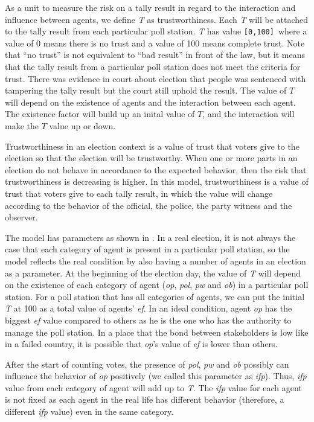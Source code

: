 \documentclass[JIP]{ipsj}
\def\|{\verb|}
\begin{document}
As a unit to measure the risk on a tally result in regard to the interaction and influence between agents, we define \textit{T} as trustworthiness. Each \textit{T} will be attached to the tally result from each particular poll station. \textit{T} has value \|[0,100]|\ where a value of 0 means there is no trust and a value of 100 means complete trust. Note that “no trust” is not equivalent to “bad result” in front of the law, but it means that the tally result from a particular poll station does not meet the criteria for trust. There was evidence in court about election that people was sentenced with tampering the tally result but the court still uphold the result. The value of $T$ will depend on the existence of agents and the interaction between each agent. The existence factor will build up an inital value of $T$, and the interaction will make the $T$ value up or down.

Trustworthiness in an election context is a value of trust that voters give to the election so that the election will be trustworthy. When one or more parts in an election do not behave in accordance to the expected behavior, then the risk that trustworthiness is decreasing is higher. In this model, trustworthiness is a value of trust that voters give to each tally result, in which the value will change according to the behavior of the official, the police, the party witness and the observer.

The model has parameters as shown in . In a real election, it is not always the case that each category of agent is present in a particular poll station, so the model reflects the real condition by also having a number of agents in an election as a parameter. At the beginning of the election day, the value of \textit{T} will depend on the existence of each category of agent (\textit{op}, \textit{pol}, \textit{pw} and \textit{ob}) in a particular poll station. For a poll station that has all categories of agents, we can put the initial \textit{T} at 100 as a total value of agents' \textit{ef}. In an ideal condition, agent \textit{op} has the biggest \textit{ef} value compared to others as he is the one who has the authority to manage the poll station. In a place that the bond between stakeholders is low like in a failed country, it is possible that \textit{op}'s value of \textit{ef} is lower than others.

After the start of counting votes, the presence of \textit{pol}, \textit{pw} and \textit{ob} possibly can influence the behavior of \textit{op} positively (we called this parameter as \textit{ifp}). Thus, \textit{ifp} value from each category of agent will add up to \textit{T}. The \textit{ifp} value for each agent is not fixed as each agent in the real life has different behavior (therefore, a different \textit{ifp} value) even in the same category. 
\end{document}
